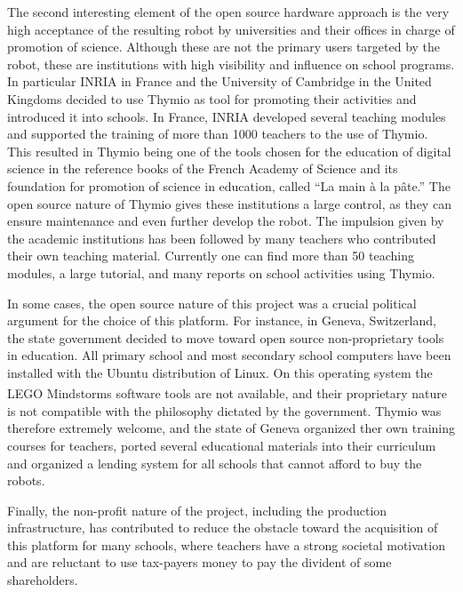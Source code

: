 \documentclass[letterpaper, 10 pt, conference]{ieeeconf}  %
\begin{document}
The second interesting element of the open source hardware approach is the very high acceptance of the resulting robot by universities and their offices in charge of promotion of science.
Although these are not the primary users targeted by the robot, these are institutions with high visibility and influence on school programs. 
In particular INRIA in France and the University of Cambridge in the United Kingdoms decided to use Thymio as tool for promoting their activities and introduced it into schools.
In France, INRIA developed several teaching modules and supported the training of more than 1000 teachers to the use of Thymio. 
This resulted in Thymio being one of the tools chosen for the education of digital science in the reference books of the French Academy of Science and its foundation for promotion of science in education, called ``La main \`a la p\^ate.''
The open source nature of Thymio gives these institutions a large control, as they can ensure maintenance and even further develop the robot.
The impulsion given by the academic institutions has been followed by many teachers who contributed their own teaching material. 
Currently one can find more than 50 teaching modules, a large tutorial, and many reports on school activities using Thymio. 

In some cases, the open source nature of this project was a crucial political argument for the choice of this platform.
For instance, in Geneva, Switzerland, the state government decided to move toward open source non-proprietary tools in education.
All primary school and most secondary school computers have been installed with the Ubuntu distribution of Linux. 
On this operating system the LEGO\textsuperscript{\textregistered} Mindstorms\textsuperscript{\textregistered} software tools are not available, and their proprietary nature is not compatible with the philosophy dictated by the government. 
Thymio was therefore extremely welcome, and the state of Geneva organized ther own training courses for teachers, ported several educational materials into their curriculum and organized a lending system for all schools that cannot afford to buy the robots.

Finally, the non-profit nature of the project, including the production infrastructure, has contributed to reduce the obstacle toward the acquisition of this platform for many schools, where teachers have a strong societal motivation and are reluctant to use tax-payers money to pay the divident of some shareholders.
\end{document}
